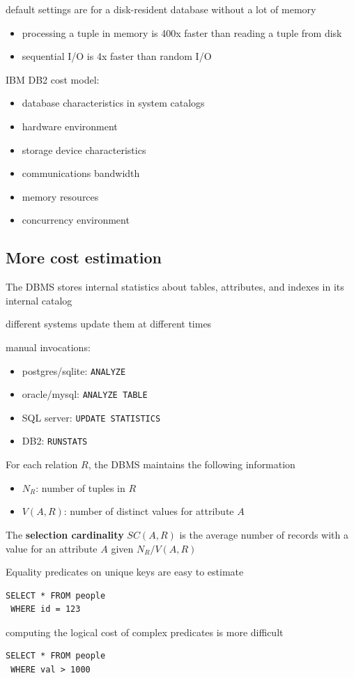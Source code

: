 \documentclass[11pt]{article}
\begin{document}
default settings are for a disk-resident database without a lot of memory
\begin{itemize}
\item processing a tuple in memory is 400x faster than reading a tuple from disk
\item sequential I/O is 4x faster than random I/O
\end{itemize}

IBM DB2 cost model:
\begin{itemize}
\item database characteristics in system catalogs
\item hardware environment
\item storage device characteristics
\item communications bandwidth
\item memory resources
\item concurrency environment
\end{itemize}
\subsection{More cost estimation}
\label{sec:orgf975c18}
The DBMS stores internal statistics about tables, attributes, and indexes in its internal
catalog

different systems update them at different times

manual invocations:
\begin{itemize}
\item postgres/sqlite: \texttt{ANALYZE}
\item oracle/mysql: \texttt{ANALYZE TABLE}
\item SQL server: \texttt{UPDATE STATISTICS}
\item DB2: \texttt{RUNSTATS}
\end{itemize}

For each relation \(R\), the DBMS maintains the following information
\begin{itemize}
\item \(N_R\): number of tuples in \(R\)
\item \(V(A,R)\): number of distinct values for attribute \(A\)
\end{itemize}

The \textbf{selection cardinality} \(SC(A,R)\) is the average number of records with a value for an
attribute \(A\) given \(N_R/V(A,R)\)

Equality predicates on unique keys are easy to estimate
\begin{verbatim}
SELECT * FROM people
 WHERE id = 123
\end{verbatim}
computing the logical cost of complex predicates is more difficult
\begin{verbatim}
SELECT * FROM people
 WHERE val > 1000
\end{verbatim}
\end{document}
